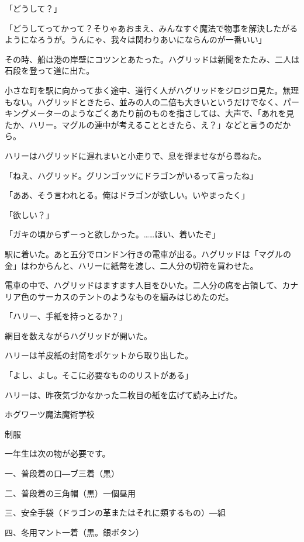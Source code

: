\documentclass[10pt,a4paper]{article}
\begin{document}
\begin{CJK}{UTF8}{min}
「どうして？」

「どうしてってかって？そりゃあおまえ、みんなすぐ魔法で物事を解決したがるようになろうが。うんにゃ、我々は関わりあいにならんのが一番いい」

その時、船は港の岸壁にコツンとあたった。ハグリッドは新聞をたたみ、二人は石段を登って道に出た。

小さな町を駅に向かって歩く途中、道行く人がハグリッドをジロジロ見た。無理もない。ハグリッドときたら、並みの人の二倍も大きいというだけでなく、パーキングメーターのようなごくあたり前のものを指さしては、大声で、「あれを見たか、ハリー。マグルの連中が考えることときたら、え？」などと言うのだから。

ハリーはハグリッドに遅れまいと小走りで、息を弾ませながら尋ねた。

「ねえ、ハグリッド。グリンゴッツにドラゴンがいるって言ったね」

「ああ、そう言われとる。俺はドラゴンが欲しい。いやまったく」

「欲しい？」

「ガキの頃からずーっと欲しかった。……ほい、着いたぞ」

駅に着いた。あと五分でロンドン行きの電車が出る。ハグリッドは「マグルの金」はわからんと、ハリーに紙幣を渡し、二人分の切符を買わせた。

電車の中で、ハグリッドはますます人目をひいた。二人分の席を占領して、カナリア色のサーカスのテントのようなものを編みはじめたのだ。

「ハリー、手紙を持っとるか？」

網目を数えながらハグリッドが開いた。

ハリーは羊皮紙の封筒をポケットから取り出した。

「よし、よし。そこに必要なもののリストがある」

ハリーは、昨夜気づかなかった二枚目の紙を広げて読み上げた。







ホグワーツ魔法魔術学校





制服

一年生は次の物が必要です。

一、普段着の口―ブ三着（黒）

二、普段着の三角帽（黒）一個昼用

三、安全手袋（ドラゴンの革またはそれに類するもの）―組

四、冬用マント一着（黒。銀ボタン）


\end{CJK}
\end{document}

